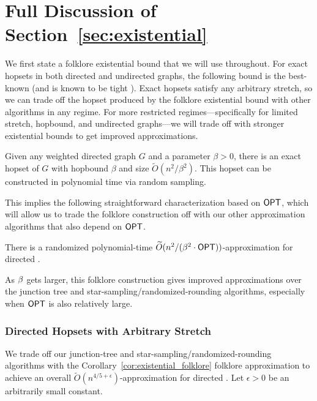 \section{Full Discussion of Section~\ref{sec:existential}} \label{app:tradeoffs}


We first state a folklore existential bound that we will use throughout. For exact hopsets in both directed and undirected graphs, the following bound is the best-known (and is known to be tight \cite{BH23folklore}). Exact hopsets satisfy any arbitrary stretch, so we can trade off the hopset produced by the folklore existential bound with other algorithms in any regime. For more restricted regimes---specifically for limited stretch, hopbound, and undirected graphs---we will trade off with stronger existential bounds to get improved approximations.

\begin{lemma}
    Given any weighted directed graph $G$ and a parameter $\beta >0$, there is an exact hopset of $G$ with hopbound $\beta$ and size $\widetilde{O}(n^2/\beta^2)$. This hopset can be constructed in polynomial time via random sampling.
\end{lemma}

This implies the following straightforward characterization based on ${\sf OPT}$, which will allow us to trade the folklore construction off with our other approximation algorithms that also depend on ${\sf OPT}$.

\begin{corollary} \label{cor:existential_folklore}
    There is a randomized polynomial-time $\widetilde{O}(n^2/ (\beta^2 \cdot {\sf OPT}))$-approximation for directed {\hopset}.
\end{corollary}

As $\beta$ gets larger, this folklore construction gives improved approximations over the junction tree and star-sampling/randomized-rounding algorithms, especially when ${\sf OPT}$ is also relatively large. 

\subsubsection{Directed Hopsets with Arbitrary Stretch}
We trade off our junction-tree and star-sampling/randomized-rounding algorithms with the Corollary~\ref{cor:existential_folklore} folklore approximation to achieve an overall $\widetilde{O}(n^{4/5 + \epsilon})$-approximation for directed {\hopset}. Let $\epsilon > 0$ be an arbitrarily small constant.

